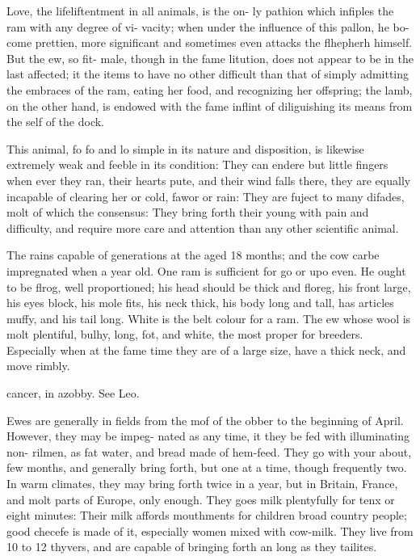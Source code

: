 \documentclass{article}
\begin{document}
Love, the lifeliftentment in all animals, is the on- ly pathion which infiples the ram with any degree of vi- vacity; when under the influence of this pallon, he bo- come prettien, more significant and sometimes even attacks the flhepherh himself. But the ew, so fit- male, though in the fame litution, does not appear to be in the last affected; it the items to have no other difficult than that of simply admitting the embraces of the ram, eating her food, and recognizing her offspring; the lamb, on the other hand, is endowed with the fame inflint of diliguishing its means from the self of the dock.

This animal, fo fo and lo simple in its nature and disposition, is likewise extremely weak and feeble in its condition: They can endere but little fingers when ever they ran, their hearts pute, and their wind falls there, they are equally incapable of clearing her or cold, fawor or rain: They are fuject to many difades, molt of which the consensus: They bring forth their young with pain and difficulty, and require more care and attention than any other scientific animal.

The rains capable of generations at the aged 18 months; and the cow carbe impregnated when a year old. One ram is sufficient for go or upo even. He ought to be flrog, well proportioned; his head should be thick and floreg, his front large, his eyes block, his mole fits, his neck thick, his body long and tall, has articles muffy, and his tail long. White is the belt colour for a ram. The ew whose wool is molt plentiful, bulhy, long, fot, and white, the most proper for breeders. Especially when at the fame time they are of a large size, have a thick neck, and move rimbly.

cancer, in azobby. See Leo.

Ewes are generally in fields from the mof of the obber to the beginning of April. However, they may be impeg- nated as any time, it they be fed with illuminating non- rilmen, as fat water, and bread made of hem-feed. They go with your about, few months, and generally bring forth, but one at a time, though frequently two. In warm climates, they may bring forth twice in a year, but in Britain, France, and molt parts of Europe, only enough. They goes milk plentyfully for tenx or eight minutes: Their milk affords mouthments for children broad country people; good checefe is made of it, especially women mixed with cow-milk. They live from 10 to 12 thyvers, and are capable of bringing forth an long as they tailites.
\end{document}

